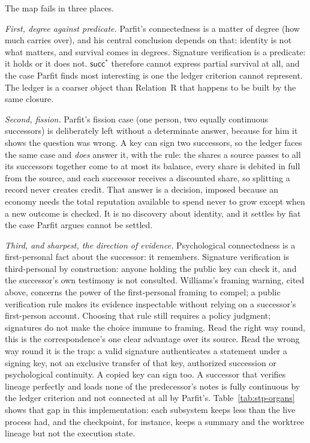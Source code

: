 \documentclass[11pt,a4paper]{article}
\theoremstyle{definition}
\begin{document}
\begin{pdboundary}
\setlength{\parskip}{4pt plus 1pt}
The map fails in three places.

\emph{First, degree against predicate.} Parfit's connectedness is a matter of
degree (how much carries over), and his central conclusion depends on that:
identity is not what matters, and survival comes in degrees. Signature
verification is a predicate: it holds or it does not. $\mathsf{succ}^{*}$
therefore cannot express partial survival at all, and the case Parfit finds
most interesting is one the ledger criterion cannot represent. The ledger is a
coarser object than Relation~R that happens to be built by the same closure.

\ifpdmargincolumn\pdnomintsketch\fi
\emph{Second, fission.} Parfit's fission case (one person, two equally
continuous successors) is deliberately left without a determinate answer,
because for him it shows the question was wrong. A key can sign two
successors, so the ledger faces the same case and \emph{does} answer it, with
the  rule: the shares a source passes to all its successors
together come to at most its balance, every share is debited in full from the
source, and each successor receives a discounted share, so splitting a
record never creates credit. That answer is a decision, imposed because an
economy needs the total reputation available to spend never to grow except
when a new outcome is checked. It is no
discovery about identity, and it settles by fiat the case Parfit argues cannot
be settled.

\emph{Third, and sharpest, the direction of evidence.} Psychological
connectedness is a first-personal fact about the successor: it remembers.
Signature verification is third-personal by construction: anyone holding the
public key can check it, and the successor's own testimony is not consulted.
Williams's framing warning, cited above, concerns the power of the
first-personal framing to compel; a public verification rule makes its
evidence inspectable without relying on a successor's first-person account. Choosing that rule still requires a policy
judgment; signatures do not make the choice immune to framing. Read the right way round,
this is the correspondence's one clear advantage over its source. Read the
wrong way round it is the trap: a valid signature authenticates a statement
under a signing key, not an exclusive transfer of that key, authorized
succession or psychological continuity. A copied key can sign too. A successor
that verifies lineage perfectly and loads none of the predecessor's notes is
fully continuous by the ledger criterion and not connected at all by Parfit's.
Table~\ref{tab:stp-organs} shows that gap in this implementation: each
subsystem keeps less than the live process had, and the checkpoint, for
instance, keeps a summary and the worktree lineage but not the execution state.


\end{pdboundary}
\end{document}
